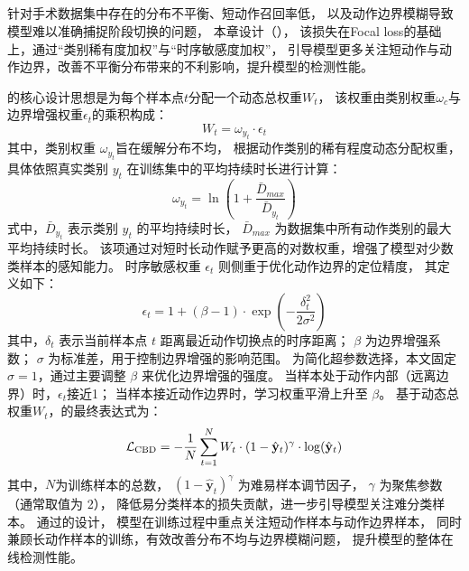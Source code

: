 \subsection{\lossfull}
针对手术数据集中存在的分布不平衡、短动作召回率低，
以及动作边界模糊导致模型难以准确捕捉阶段切换的问题，
本章设计\lossfull（\lossshort），
该损失在Focal loss\cite{tian2019fcos}的基础上，通过“类别稀有度加权”与“时序敏感度加权”，
引导模型更多关注短动作与动作边界，改善不平衡分布带来的不利影响，提升模型的检测性能。

\lossshort 的核心设计思想是为每个样本点\(t\)分配一个动态总权重\(W_t\)，
该权重由类别权重\(\omega_c\)与边界增强权重\(\epsilon_t\)的乘积构成：
\begin{equation}
W_t = \omega_{y_t} \cdot \epsilon_t
\end{equation}
其中，类别权重 \(\omega_{y_t}\)旨在缓解分布不均，
根据动作类别的稀有程度动态分配权重，
具体依照真实类别 \(y_t\) 在训练集中的平均持续时长进行计算：
\begin{equation}
\omega_{y_t} = \ln\left(1 + \frac{\bar{D}_{max}}{\bar{D}_{y_t}}\right)
\end{equation}
式中，\(\bar{D}_{y_t}\) 表示类别 \(y_t\) 的平均持续时长，
\(\bar{D}_{max}\) 为数据集中所有动作类别的最大平均持续时长。
该项通过对短时长动作赋予更高的对数权重，增强了模型对少数类样本的感知能力。
时序敏感权重 \(\epsilon_t\) 则侧重于优化动作边界的定位精度，
其定义如下：
\begin{equation}
    \epsilon_t = 1 + (\beta - 1) \cdot \exp\left(-\frac{\delta_t^2}{2\sigma^2}\right)
\end{equation}
其中，\(\delta_t\) 表示当前样本点 \(t\) 距离最近动作切换点的时序距离；
\(\beta\) 为边界增强系数；
\(\sigma\) 为标准差，用于控制边界增强的影响范围。
为简化超参数选择，本文固定 \(\sigma=1\)，通过主要调整 \(\beta\) 来优化边界增强的强度。
当样本处于动作内部（远离边界）时，\(\epsilon_t\)接近1；
当样本接近动作边界时，学习权重平滑上升至 \(\beta\)。
基于动态总权重\(W_t\)，\lossshort 的最终表达式为：
\begin{equation}
    \mathcal{L}_{\text{\lshort}} = -\frac{1}{N} \sum_{t=1}^N W_t 
    \cdot (1 - \hat{\mathbf{y}}_t)^\gamma \cdot \log(\hat{\mathbf{y}}_t)
\end{equation}
其中，\(N\)为训练样本的总数，
\((1 - \hat{\mathbf{y}}_t)^\gamma\) 为难易样本调节因子，
\(\gamma\) 为聚焦参数（通常取值为 2），
降低易分类样本的损失贡献，进一步引导模型关注难分类样本。
通过\lossshort 的设计，
模型在训练过程中重点关注短动作样本与动作边界样本，
同时兼顾长动作样本的训练，有效改善分布不均与边界模糊问题，
提升模型的整体在线检测性能。

